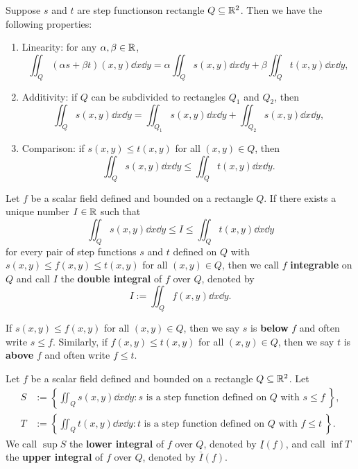 \begin{theoremenv}
    Suppose $s$ and $t$ are step functionson rectangle $Q\subseteq \mathbb{R}^2$. Then we have the following properties:
    \begin{enumerate}[label=(\arabic*)]
        \item Linearity: for any $\alpha, \beta \in \mathbb{R}$,
        $$ \iint_Q (\alpha s + \beta t)(x,y) \dd x \dd y = \alpha \iint_Q s(x,y) \dd x \dd y + \beta \iint_Q t(x,y) \dd x \dd y, $$
        \item Additivity: if $Q$ can be subdivided to rectangles $Q_1$ and $Q_2$, then
        $$ \iint_Q s(x,y) \dd x \dd y = \iint_{Q_1} s(x,y) \dd x \dd y + \iint_{Q_2} s(x,y) \dd x \dd y, $$
        \item Comparison: if $s(x,y) \leq t(x,y)$ for all $(x,y) \in Q$, then
        $$ \iint_Q s(x,y) \dd x \dd y \leq \iint_Q t(x,y) \dd x \dd y. $$
    \end{enumerate}
\end{theoremenv}
\begin{definitionenv}
    Let $f$ be a scalar field defined and bounded on a rectangle $Q$. If there exists a unique number $I\in \mathbb{R}$ such that
    $$
    \iint_Q s(x,y) \dd x \dd y \leq I \leq \iint_Q t(x,y) \dd x \dd y
    $$
    for every pair of step functions $s$ and $t$ defined on $Q$ with $s(x,y) \leq f(x,y) \leq t(x,y)$ for all $(x,y) \in Q$, then we call $f$ \textbf{integrable} on $Q$ and call $I$ the \textbf{double integral} of $f$ over $Q$, denoted by
    \[
    I := \iint_Q f(x,y) \dd x \dd y.
    \]
\end{definitionenv}
\begin{remarkenv}
    If $s(x,y) \leq f(x,y)$ for all $(x,y) \in Q$, then we say $s$ is \textbf{below} $f$ and often write $s \leq f$. Similarly, if $f(x,y) \leq t(x,y)$ for all $(x,y) \in Q$, then we say $t$ is \textbf{above} $f$ and often write $f \leq t$.
\end{remarkenv}
\begin{definitionenv}
    Let $f$ be a scalar field defined and bounded on a rectangle $Q\subseteq \mathbb{R}^2$. Let
    $$
    \begin{aligned}
        S&:= \left\{ \iint_Q s(x,y) \dd x \dd y : s \text{ is a step function defined on } Q \text{ with } s \leq f\ \right\},\\ T&:= \left\{ \iint_Q t(x,y) \dd x \dd y : t \text{ is a step function defined on } Q \text{ with } f \leq t\ \right\}.
    \end{aligned}
    $$
    We call $\sup S$ the \textbf{lower integral} of $f$ over $Q$, denoted by $\underline{I}(f)$, and call $\inf T$ the \textbf{upper integral} of $f$ over $Q$, denoted by $\overline{I}(f)$.
\end{definitionenv}
